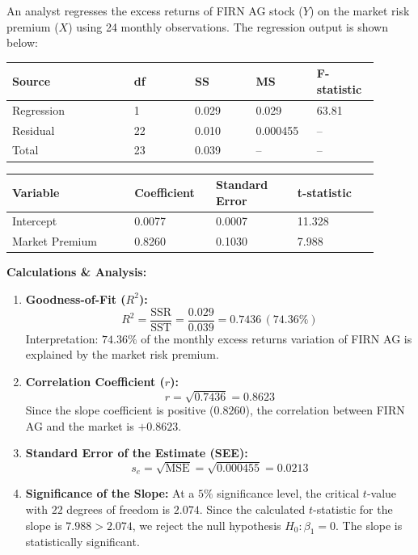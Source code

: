 \begin{tcolorbox}[
	colback=gray!5!white,
	colframe=black!15!white,
	boxrule=0.5pt,
	arc=3pt,
	title=\textbf{Example: Evaluating FIRN AG Stock Regression},
	coltitle=black,
	colbacktitle=black!5!white,
	before skip=6pt,
	after skip=6pt,
	breakable
]
An analyst regresses the excess returns of FIRN AG stock ($Y$) on the market risk premium ($X$) using 24 monthly observations. The regression output is shown below:

\begin{center}
\begin{tabular}{p{0.3\linewidth} p{0.15\linewidth} p{0.15\linewidth} p{0.15\linewidth} p{0.15\linewidth}}
	\toprule
	\textbf{Source} & \textbf{df} & \textbf{SS} & \textbf{MS} & \textbf{F-statistic} \\
	\midrule
	Regression & 1 & 0.029 & 0.029 & 63.81 \\
	Residual & 22 & 0.010 & 0.000455 & -- \\
	Total & 23 & 0.039 & -- & -- \\
	\bottomrule
\end{tabular}
\end{center}

\begin{center}
\begin{tabular}{p{0.3\linewidth} p{0.20\linewidth} p{0.20\linewidth} p{0.20\linewidth}}
	\toprule
	\textbf{Variable} & \textbf{Coefficient} & \textbf{Standard Error} & \textbf{t-statistic} \\
	\midrule
	Intercept & 0.0077 & 0.0007 & 11.328 \\
	Market Premium & 0.8260 & 0.1030 & 7.988 \\
	\bottomrule
\end{tabular}
\end{center}

\textbf{Calculations \& Analysis:}
\begin{enumerate}
	\item \textbf{Goodness-of-Fit ($R^2$):}
	\[ R^2 = \frac{\text{SSR}}{\text{SST}} = \frac{0.029}{0.039} = 0.7436 \, (74.36\%) \]
	Interpretation: $74.36\%$ of the monthly excess returns variation of FIRN AG is explained by the market risk premium.
	\item \textbf{Correlation Coefficient ($r$):}
	\[ r = \sqrt{0.7436} = 0.8623 \]
	Since the slope coefficient is positive ($0.8260$), the correlation between FIRN AG and the market is $+0.8623$.
	\item \textbf{Standard Error of the Estimate (SEE):}
	\[ s_e = \sqrt{\text{MSE}} = \sqrt{0.000455} = 0.0213 \]
	\item \textbf{Significance of the Slope:}
	At a $5\%$ significance level, the critical $t$-value with $22$ degrees of freedom is $2.074$.
	Since the calculated $t$-statistic for the slope is $7.988 > 2.074$, we reject the null hypothesis $H_0: \beta_1 = 0$. The slope is statistically significant.
\end{enumerate}
\end{tcolorbox}

